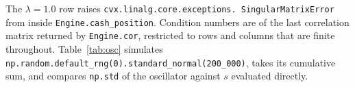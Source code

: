 \documentclass[11pt,a4paper]{article}
\newcommand{\code}[1]{\texttt{#1}}
\begin{document}
The $\lambda = 1.0$ row raises \code{cvx.linalg.core.exceptions.\allowbreak
SingularMatrixError} from inside \code{Engine.cash\_position}. Condition numbers
are of the last correlation matrix returned by \code{Engine.cor}, restricted to
rows and columns that are finite throughout. Table~\ref{tab:osc} simulates
\code{np.random.default\_rng(0).standard\_normal(200\_000)}, takes its cumulative
sum, and compares \code{np.std} of the oscillator against $s$ evaluated
directly.



\end{document}
